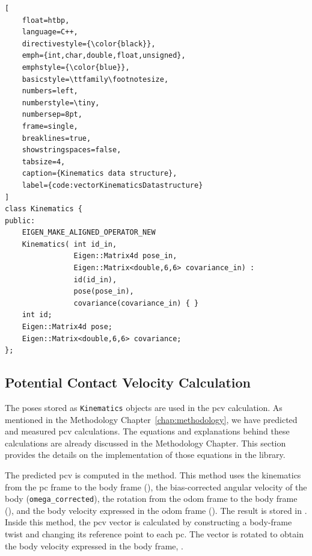 \documentclass[report.tex]{subfiles}
\begin{document}
\begin{lstlisting}[
    float=htbp,
    language=C++,
    directivestyle={\color{black}},
    emph={int,char,double,float,unsigned},
    emphstyle={\color{blue}},
    basicstyle=\ttfamily\footnotesize,
    numbers=left,
    numberstyle=\tiny,
    numbersep=8pt,
    frame=single,
    breaklines=true,
    showstringspaces=false,
    tabsize=4,
    caption={Kinematics data structure},
    label={code:vectorKinematicsDatastructure}
]
class Kinematics {
public:
    EIGEN_MAKE_ALIGNED_OPERATOR_NEW
    Kinematics( int id_in, 
                Eigen::Matrix4d pose_in, 
                Eigen::Matrix<double,6,6> covariance_in) : 
                id(id_in), 
                pose(pose_in), 
                covariance(covariance_in) { }
    int id;
    Eigen::Matrix4d pose;
    Eigen::Matrix<double,6,6> covariance;
};        
\end{lstlisting}
       
    \subsection{Potential Contact Velocity Calculation}
    
    The poses stored as \texttt{Kinematics} objects are used in the \gls{pcv} calculation. As mentioned in the Methodology Chapter~\ref{chap:methodology}, we have predicted and measured \gls{pcv} calculations. The equations and explanations behind these calculations are already discussed in the Methodology Chapter. This section provides the details on the implementation of those equations in the library. 
    
    The predicted \gls{pcv} is computed in the  method. This method uses the kinematics from the \gls{pc} frame to the body frame (), the bias-corrected angular velocity of the body (\texttt{omega\_corrected}), the rotation from the odom frame to the body frame (), and the body velocity expressed in the odom frame (). The result is stored in . Inside this method, the \gls{pcv} vector is calculated by constructing a body-frame twist and changing its reference point to each \gls{pc}. The  vector is rotated to obtain the body velocity expressed in the body frame, .
    
\end{document}
